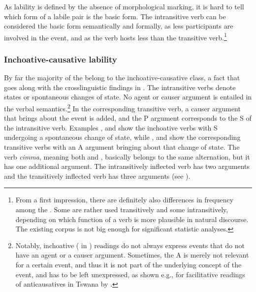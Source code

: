 As lability is defined by the absence of morphological marking, it is hard to tell which form of a labile pair is the basic form.  The intransitive verb can be considered the basic form semantically and formally, as less participants are involved in the event, and as the verb hosts less  than the transitive verb.\footnote{From a first impression, there are definitely also differences in frequency among the . Some are rather used transitively and some intransitively, depending on which function of a verb is more plausible in natural discourse. The existing corpus is not big enough for significant statistic analyses.} 
 
\subsubsection{Inchoative-causative lability}

By far the majority of the  belong to the inchoative-causative class, a fact that goes along with the crosslinguistic findings in \citet{Letuchiy2009Labile}. The intransitive verbs denote states or spontaneous changes of state. No agent or causer argument is entailed in the verbal semantics.\footnote{Notably, inchoative ( in \citealt{Creissels2012_Lability}) readings do not always express events that do not have an agent or a causer argument. Sometimes, the A is merely not relevant for a certain event, and thus it is not part of the underlying concept of the event, and has to be left unexpressed, as shown  e.g., for facilitative readings of anticausatives in Tswana by \citet{Creissels2012_Lability}.} In the corresponding transitive verb, a causer argument that brings about the event is added, and the P argument  corresponds to the S of the intransitive verb. Examples \Next[a], \Next[c] and \Next[e] show the inchoative verbs with S undergoing a spontaneous change of state, while \Next[b], \Next[d] and \Next[f] show the corresponding transitive verbs with an A argument bringing about that change of state. The verb \emph{cimma}, meaning both  and , basically belongs to the same alternation, but it has one additional argument. The intransitively inflected verb has two arguments and the transitively inflected verb has three arguments (see ).  


